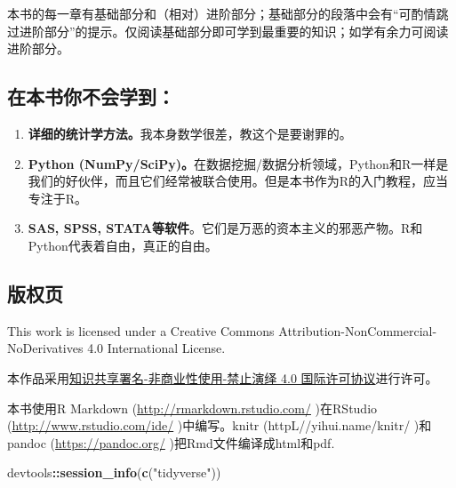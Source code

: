 \documentclass[]{book}
\newenvironment{Shaded}{\begin{snugshade}}{\end{snugshade}}
\newcommand{\KeywordTok}[1]{\textcolor[rgb]{0.13,0.29,0.53}{\textbf{#1}}}
\newcommand{\NormalTok}[1]{#1}
\newcommand{\OperatorTok}[1]{\textcolor[rgb]{0.81,0.36,0.00}{\textbf{#1}}}
\newcommand{\StringTok}[1]{\textcolor[rgb]{0.31,0.60,0.02}{#1}}
\providecommand{\tightlist}{%
  \setlength{\itemsep}{0pt}\setlength{\parskip}{0pt}}
\begin{document}
本书的每一章有基础部分和（相对）进阶部分；基础部分的段落中会有``可酌情跳过进阶部分''的提示。仅阅读基础部分即可学到最重要的知识；如学有余力可阅读进阶部分。

\subsection*{在本书你不会学到：}

\begin{enumerate}
\def\labelenumi{\arabic{enumi}.}
\tightlist
\item
  \textbf{详细的统计学方法。}我本身数学很差，教这个是要谢罪的。
\item
  \textbf{Python (NumPy/SciPy)。}在数据挖掘/数据分析领域，Python和R一样是我们的好伙伴，而且它们经常被联合使用。但是本书作为R的入门教程，应当专注于R。
\item
  \textbf{SAS, SPSS, STATA等软件}。它们是万恶的资本主义的邪恶产物。R和Python代表着自由，真正的自由。
\end{enumerate}

\subsection*{版权页}

This work is licensed under a Creative Commons Attribution-NonCommercial-NoDerivatives 4.0 International License.
\doclicenseThis

本作品采用\href{https://creativecommons.org/licenses/by-nc-nd/4.0/deed.zh}{知识共享署名-非商业性使用-禁止演绎 4.0 国际许可协议}进行许可。

本书使用R Markdown (\url{http://rmarkdown.rstudio.com/} )在RStudio (\url{http://www.rstudio.com/ide/} )中编写。knitr (httpL//yihui.name/knitr/ )和pandoc (\url{https://pandoc.org/} )把Rmd文件编译成html和pdf.

\begin{Shaded}
\begin{Highlighting}[]
\NormalTok{devtools}\OperatorTok{::}\KeywordTok{session_info}\NormalTok{(}\KeywordTok{c}\NormalTok{(}\StringTok{"tidyverse"}\NormalTok{))}
\end{Highlighting}
\end{Shaded}
\end{document}
